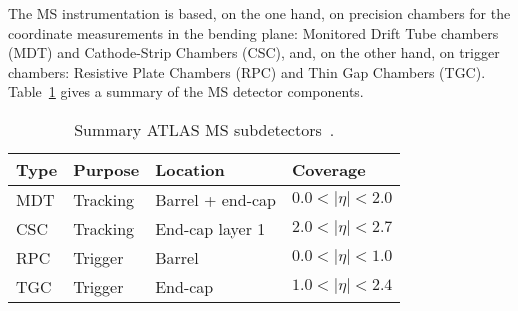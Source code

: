 The MS instrumentation is based, on the one hand, on precision chambers for the coordinate measurements in the bending plane: 
Monitored Drift Tube chambers (MDT) and Cathode-Strip Chambers (CSC), and, on the other hand, on trigger chambers:
Resistive Plate Chambers (RPC) and Thin Gap Chambers (TGC).  Table~\ref{tab:Chap2:ATLAS:MS} gives a summary of the MS 
detector components.  %


\begin{table}[h]
\centering
\begin{tabular}{llll}
\toprule
Type & Purpose  & Location         	& Coverage 			\\ \midrule
MDT  & Tracking & Barrel + end-cap &  $0.0 < |\eta| < 2.0$       	\\
CSC  & Tracking & End-cap layer 1  	&  $2.0 < |\eta| < 2.7$       	\\
RPC  & Trigger    & Barrel           	&  $0.0 < |\eta| < 1.0$     	\\
TGC  & Trigger    & End-cap          	&  $1.0 < |\eta| < 2.4$        \\
 \bottomrule
\end{tabular}
\caption{Summary ATLAS MS subdetectors~\cite{Ishii:2001hy}.}
\label{tab:Chap2:ATLAS:MS}
\end{table}

